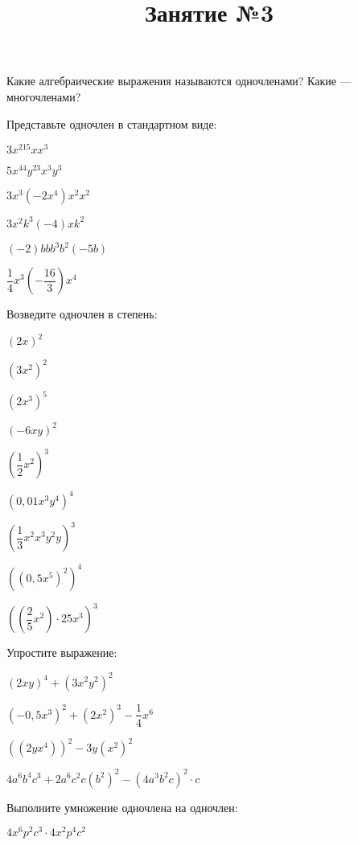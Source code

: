 \newpage
\title{Занятие №3}
\begin{listofex}
	\item Какие алгебраические выражения называются одночленами? Какие --- многочленами?
	\item Представьте одночлен в стандартном виде:
	\begin{enumcols}[itemcolumns=3]
		\item \( 3x^215xx^3 \)
		\item \( 5x^44y^23x^3y^3 \)
		\item \( 3x^3(-2x^4) x^2x^2 \)
		\item \( 3x^2k^3(-4)xk^2 \)
		\item \( (-2)bbb^3b^2(-5b) \)
		\item \( \dfrac{1}{4}x^3\left( -\dfrac{16}{3} \right)x^4 \)
	\end{enumcols}
	\item Возведите одночлен в степень:
	\begin{enumcols}[itemcolumns=4]
		\item \( (2x)^2 \)
		\item \( (3x^2)^2 \)
		\item \( (2x^3)^5 \)
		\item \( (-6xy)^2 \)
		\item \( \left( \dfrac{1}{2}x^2 \right)^3 \)
		\item \( (0,01x^3y^4)^4 \)
		\item \( \left( \dfrac{1}{3}x^2x^3y^2y \right)^3 \)
		\item \( \left( (0,5x^5)^2 \right)^4 \)
		\item \( \left( \left( \dfrac{2}{5}x^2 \right)\cdot25x^3 \right)^3 \)
	\end{enumcols}
	\item Упростите выражение:
	\begin{enumcols}[itemcolumns=2]
		\item \( (2xy)^4+(3x^2y^2)^2 \)
		\item \( (-0,5x^3)^2+(2x^2)^3-\dfrac{1}{4}x^6 \)
		\item \( \left( (2yx^4) \right)^2-3y\left( x^2 \right)^2 \)
		\item \( 4a^6b^4c^3+2a^6c^2c(b^2)^2-\left( 4a^3b^2c \right)^2\cdot c \)
	\end{enumcols}
	\item Выполните умножение одночлена на одночлен:
	\begin{enumcols}[itemcolumns=2]
		\item \( 4x^6p^2c^3\cdot4x^2p^4c^2 \)

\end{enumcols}
\end{listofex}
